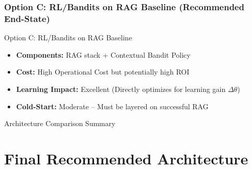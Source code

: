 \documentclass[aspectratio=169]{beamer}
\begin{document}
\begin{frame}
\frametitle{Option C: RL/Bandits on RAG Baseline (Recommended End-State)}
\begin{block}{Option C: RL/Bandits on RAG Baseline}
\begin{itemize}
\item \textbf{Components:} RAG stack + Contextual Bandit Policy
\item \textbf{Cost:} High Operational Cost but potentially high ROI
\item \textbf{Learning Impact:} \textcolor{mygreen}{Excellent} (Directly optimizes for learning gain $\Delta\theta$)
\item \textbf{Cold-Start:} \textcolor{myorange}{Moderate} -- Must be layered on successful RAG
\end{itemize}
\end{block}

\begin{block}{Architecture Comparison Summary}
\begin{table}
\centering
\caption{Architecture Options Comparison}
\end{table}
\end{block}
\end{frame}

\section{Final Recommended Architecture}
\end{document}
